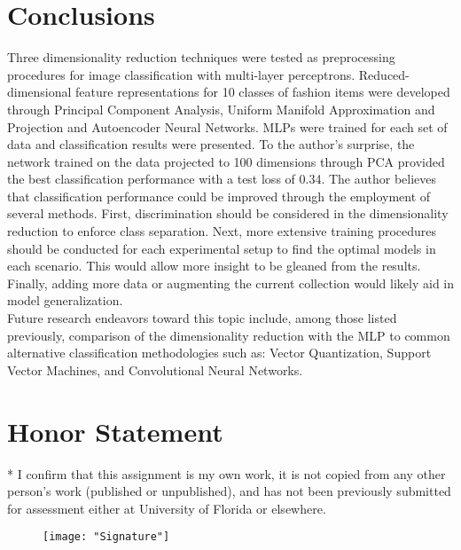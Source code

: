\documentclass[conference]{IEEEtran}
\begin{document}
\section{Conclusions} \label{Conclusions}
Three dimensionality reduction techniques were tested as preprocessing procedures for image classification with multi-layer perceptrons.  Reduced-dimensional feature representations for 10 classes of fashion items were developed through Principal Component Analysis, Uniform Manifold Approximation and Projection and Autoencoder Neural Networks.  MLPs were trained for each set of data and classification results were presented.  To the author's surprise, the network trained on the data projected to 100 dimensions through PCA provided the best classification performance with a test loss of 0.34.  The author believes that classification performance could be improved through the employment of several methods.  First, discrimination should be considered in the dimensionality reduction to enforce class separation.  Next, more extensive training procedures should be conducted for each experimental setup to find the optimal models in each scenario.  This would allow more insight to be gleaned from the results.  Finally, adding more data or augmenting the current collection would likely aid in model generalization. \\
\indent
Future research endeavors toward this topic include, among those listed previously, comparison of the dimensionality reduction with the MLP to common alternative classification methodologies such as: Vector Quantization, Support Vector Machines, and Convolutional Neural Networks. 



\section*{Honor Statement}
\noindent
* I confirm that this assignment is my own work, it is not copied from any other person's work (published or unpublished), and has not been previously submitted for assessment either at University of Florida or elsewhere.

\begin{figure}[h!]
	\centering
	\texttt{[image: "Signature"]}
\end{figure}



%
\end{document}
